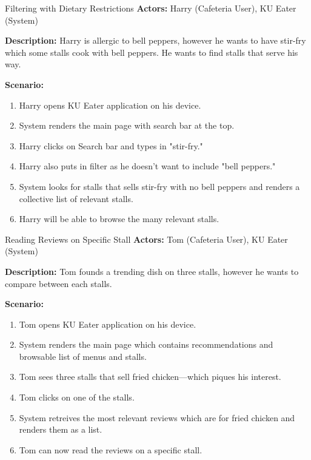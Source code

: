 \begin{usecase}{Filtering with Dietary Restrictions}
    \textbf{Actors:} Harry (Cafeteria User), KU Eater (System)

    \textbf{Description:} Harry is allergic to bell peppers, however he wants to have stir-fry which some stalls cook with bell peppers.
    He wants to find stalls that serve his way.

    \textbf{Scenario:}

    \begin{enumerate}[leftmargin=80pt]
        \item Harry opens KU Eater application on his device.
        \item System renders the main page with search bar at the top.
        \item Harry clicks on Search bar and types in "stir-fry."
        \item Harry also puts in filter as he doesn't want to include "bell peppers."
        \item System looks for stalls that sells stir-fry with no bell peppers and renders a collective list of relevant stalls.
        \item Harry will be able to browse the many relevant stalls.
    \end{enumerate}
\end{usecase}

\begin{usecase}{Reading Reviews on Specific Stall}
    \textbf{Actors:} Tom (Cafeteria User), KU Eater (System)

    \textbf{Description:} Tom founds a trending dish on three stalls, however he wants to compare between each stalls.

    \textbf{Scenario:}

    \begin{enumerate}[leftmargin=80pt]
        \item Tom opens KU Eater application on his device.
        \item System renders the main page which contains recommendations and browsable list of menus and stalls.
        \item Tom sees three stalls that sell fried chicken---which piques his interest.
        \item Tom clicks on one of the stalls.
        \item System retreives the most relevant reviews which are for fried chicken and renders them as a list.
        \item Tom can now read the reviews on a specific stall.
    \end{enumerate}
\end{usecase}

